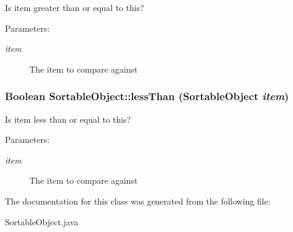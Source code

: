 Is item greater than or equal to this? 

\begin{Desc}
\item[Parameters:]
\begin{description}
\item[{\em item}]The item to compare against \end{description}
\end{Desc}
\hypertarget{class_sortable_object_24b763b682db416a7cf58713b086c9e0}{
\subsubsection[{lessThan}]{\setlength{\rightskip}{0pt plus 5cm}Boolean SortableObject::lessThan ({\bf SortableObject} {\em item})}}
\label{class_sortable_object_24b763b682db416a7cf58713b086c9e0}


Is item less than or equal to this? 

\begin{Desc}
\item[Parameters:]
\begin{description}
\item[{\em item}]The item to compare against \end{description}
\end{Desc}


The documentation for this class was generated from the following file:\begin{CompactItemize}
\item 
SortableObject.java\end{CompactItemize}
